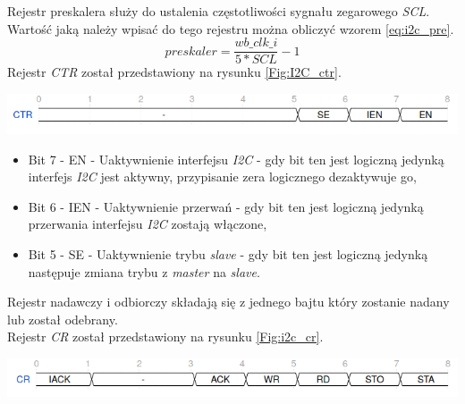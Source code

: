 \documentclass[11pt,a4paper]{article}
\begin{document}
		\\\\Rejestr preskalera służy do ustalenia częstotliwości sygnału zegarowego \textit{SCL}. Wartość jaką należy wpisać do tego rejestru można obliczyć wzorem \ref{eq:i2c_pre}.
\begin{equation} \label{eq:i2c_pre}
					preskaler = \dfrac{wb\_clk\_i}{5*SCL}-1	
\end{equation}
Rejestr \textit{CTR} został przedstawiony na rysunku \ref{Fig:I2C_ctr}.\\
			\begin{minipage}[c]{\textwidth}

					\includegraphics[width=\textwidth]{./rysunki/ctr_i2c.png}
			\end{minipage} 
			\begin{itemize}
				\item Bit 7 - EN - Uaktywnienie interfejsu \textit{I2C} - gdy bit ten jest logiczną jedynką interfejs \textit{I2C} jest aktywny, przypisanie zera logicznego dezaktywuje go,
				\item Bit 6 - IEN - Uaktywnienie przerwań - gdy bit ten jest logiczną jedynką przerwania interfejsu \textit{I2C} zostają włączone,
				\item Bit 5 - SE - Uaktywnienie trybu \textit{slave} - gdy bit ten jest logiczną jedynką następuje zmiana trybu z \textit{master} na \textit{slave}.
			\end{itemize}
			Rejestr nadawczy i odbiorczy składają się z jednego bajtu który zostanie nadany lub został odebrany.\\
			Rejestr \textit{CR} został przedstawiony na rysunku \ref{Fig:i2c_cr}.\\
	\begin{minipage}[c]{\textwidth}

					\includegraphics[width=\textwidth]{./rysunki/cr_i2c.png}
	\end{minipage} 
\end{document}
